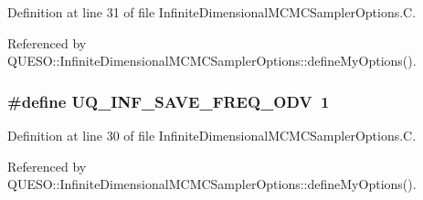 Definition at line 31 of file Infinite\-Dimensional\-M\-C\-M\-C\-Sampler\-Options.\-C.



Referenced by Q\-U\-E\-S\-O\-::\-Infinite\-Dimensional\-M\-C\-M\-C\-Sampler\-Options\-::define\-My\-Options().

\hypertarget{_infinite_dimensional_m_c_m_c_sampler_options_8_c_ab6e147540aa260f27861a36a39443878}{
\subsubsection[{U\-Q\-\_\-\-I\-N\-F\-\_\-\-S\-A\-V\-E\-\_\-\-F\-R\-E\-Q\-\_\-\-O\-D\-V}]{\setlength{\rightskip}{0pt plus 5cm}\#define U\-Q\-\_\-\-I\-N\-F\-\_\-\-S\-A\-V\-E\-\_\-\-F\-R\-E\-Q\-\_\-\-O\-D\-V~1}}\label{_infinite_dimensional_m_c_m_c_sampler_options_8_c_ab6e147540aa260f27861a36a39443878}


Definition at line 30 of file Infinite\-Dimensional\-M\-C\-M\-C\-Sampler\-Options.\-C.



Referenced by Q\-U\-E\-S\-O\-::\-Infinite\-Dimensional\-M\-C\-M\-C\-Sampler\-Options\-::define\-My\-Options().

